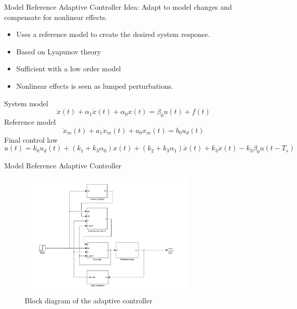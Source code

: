 \documentclass[10pt]{beamer}
\begin{document}
\begin{frame}{Model Reference Adaptive Controller}
  \alert{Idea}: Adapt to model changes and compensate for nonlinear effects.
  \begin{itemize}
    \item Uses a reference model to create the desired system response.
    \item Based on Lyapunov theory
    \item Sufficient with a low order model
    \item Nonlinear effects is seen as lumped perturbations.
  \end{itemize}
  System model
    \begin{equation*}
      \label{eq:sysmodel}
      \ddot{x}(t) + \alpha_1\dot{x}(t) +  \alpha_0x(t) = \beta_0u(t) + f(t)
    \end{equation*}
  Reference model
    \begin{equation*}
      \label{eq:refmodel}
      \ddot{x}_m(t) + a_1\dot{x}_m(t) +  a_0x_m(t) = b_0u_d(t)
    \end{equation*}
  Final control law
    \begin{equation*}
        \label{eq:adaplawsfinal}
      u(t) = k_0u_d(t) + (k_1 + k_3\alpha_0)x(t) +  (k_2 + k_3\alpha_1)\dot{x}(t) + k_3\ddot{x}(t) - k_3\beta_0u(t-T_s)
    \end{equation*}
\end{frame}

\begin{frame}{Model Reference Adaptive Controller}
  \begin{figure}[h]
    \centering %
    \includegraphics[width=0.75\textwidth, trim=5cm 0cm 3.8cm 0cm, clip=true]{../fig/matlab/adaptive_scheme}
    \caption{\label{fig:adaptive}Block diagram of the adaptive controller}
  \end{figure}
\end{frame}
\end{document}
